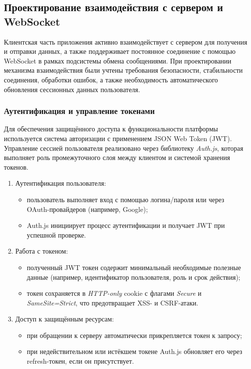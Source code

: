 \subsection{Проектирование взаимодействия с сервером и WebSocket}

Клиентская часть приложения активно взаимодействует с сервером для получения и отправки данных, а также поддерживает постоянное соединение с помощью WebSocket в рамках подсистемы обмена сообщениями. При проектировании механизма взаимодействия были учтены требования безопасности, стабильности соединения, обработки ошибок, а также необходимость автоматического обновления сессионных данных пользователя.

\subsubsection{Аутентификация и управление токенами}
Для обеспечения защищённого доступа к функциональности платформы используется система авторизации с применением JSON Web Token (JWT). Управление сессией пользователя реализовано через библиотеку \textit{Auth.js}, которая выполняет роль промежуточного слоя между клиентом и системой хранения токенов.

\begin{enumerate}
  \item Аутентификация пользователя:
  \begin{itemize}
    \item пользователь выполняет вход с помощью логина/пароля или через OAuth-провайдеров (например, Google);
    \item Auth.js инициирует процесс аутентификации и получает JWT при успешной проверке.
  \end{itemize}
  
  \item Работа с токеном:
  \begin{itemize}
    \item полученный JWT токен содержит минимальный необходимые полезные данные (например, идентификатор пользователя, роль и срок действия);
    \item токен сохраняется в \textit{HTTP-only} cookie с флагами \textit{Secure} и \textit{SameSite=Strict}, что предотвращает XSS- и CSRF-атаки.
  \end{itemize}
  
  \item Доступ к защищённым ресурсам:
  \begin{itemize}
    \item при обращении к серверу автоматически прикрепляется токен к запросу;
    \item при недействительном или истёкшем токене Auth.js обновляет его через refresh-токен, если он присутствует.
  \end{itemize}
\end{enumerate}

